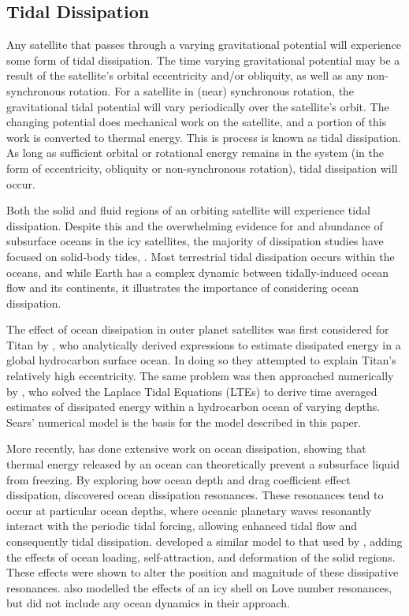 \subsection{Tidal Dissipation}

Any satellite that passes through a varying gravitational potential will experience some form of tidal dissipation. The time varying gravitational potential may be a result of the satellite's orbital eccentricity and/or obliquity, as well as any non-synchronous rotation. For a satellite in (near) synchronous rotation, the gravitational tidal potential will vary periodically over the satellite's orbit. The changing potential does mechanical work on the satellite, and a portion of this work is converted to thermal energy. This is process is known as tidal dissipation. As long as sufficient orbital or rotational energy remains in the system (in the form of eccentricity, obliquity or non-synchronous rotation), tidal dissipation will occur.

Both the solid and fluid regions of an orbiting satellite will experience tidal dissipation. Despite this and the overwhelming evidence for and abundance of subsurface oceans in the icy satellites, the majority of dissipation studies have focused on solid-body tides, \citep[e.g.,][]{moore2000tidal, tobie2005tidal,roberts2008tidal, beuthe2013spatial}.
Most terrestrial tidal dissipation occurs within the oceans, and while Earth has a complex dynamic between tidally-induced ocean flow and its continents, it illustrates the importance of considering ocean dissipation.

The effect of ocean dissipation in outer planet satellites was first considered for Titan by \citet{sagan1982tide}, who analytically derived expressions to estimate dissipated energy in a global hydrocarbon surface ocean. In doing so they attempted to explain Titan's relatively high eccentricity. The same problem was then approached numerically by \citet{sears1995tidal}, who solved the Laplace Tidal Equations (LTEs) to derive time averaged estimates of dissipated energy within a hydrocarbon ocean of varying depths. Sears' numerical model is the basis for the model described in this paper.

More recently, \citet{tyler2008strong,tyler2009ocean,tyler2011tidal,tyler2014comparative} has done extensive work on ocean dissipation, showing that thermal energy released by an ocean can theoretically prevent a subsurface liquid from freezing. By exploring how ocean depth and drag coefficient effect dissipation, \citet{tyler2011tidal} discovered ocean dissipation resonances. These resonances tend to occur at particular ocean depths, where oceanic planetary waves resonantly interact with the periodic tidal forcing, allowing enhanced tidal flow and consequently tidal dissipation. \citet{matsuyama2014tidal} developed a similar model to that used by \citet{tyler2011tidal}, adding the effects of ocean loading, self-attraction, and deformation of the solid regions. These effects were shown to alter the position and magnitude of these dissipative resonances. \citet{kamata2015tidal} also modelled the effects of an icy shell on Love number resonances, but did not include any ocean dynamics in their approach.


